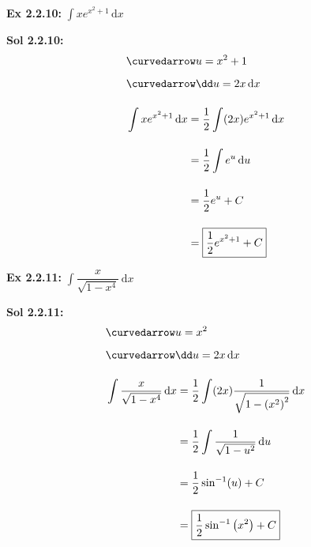\begin{tcolorbox}[example]
    \textbf{Ex 2.2.10: } $\int xe^{x^2 + 1} \,\mathrm{d}x$
\end{tcolorbox}
\begin{tcolorbox}[solution]
    \textbf{Sol 2.2.10: } \begin{align*}
        & \curvedarrow u = x^2 + 1 \\[5.5pt]
        & \curvedarrow \dd u = 2x \,\mathrm{d}x \\[11pt]
        & \int xe^{x^2 + 1} \,\mathrm{d}x \begin{aligned}[t]
            & = \dfrac{1}{2}\int (2x)e^{x^2 + 1} \,\mathrm{d}x \\[11pt]
            & = \dfrac{1}{2}\int e^u \,\mathrm{d}u \\[11pt]
            & = \dfrac{1}{2}e^u + C \\[11pt]
            & = \boxed{\dfrac{1}{2}e^{x^2 + 1} + C}
        \end{aligned}
    \end{align*}
\end{tcolorbox} \vspace{11pt}

\begin{tcolorbox}[example]
    \textbf{Ex 2.2.11: } $\int \dfrac{x}{\sqrt{1 - x^4}} \,\mathrm{d}x$
\end{tcolorbox}
\begin{tcolorbox}[solution]
    \textbf{Sol 2.2.11: } \begin{align*}
        & \curvedarrow u = x^2 \\[5.5pt]
        & \curvedarrow \dd u = 2x \,\mathrm{d}x \\[11pt]
        & \int \dfrac{x}{\sqrt{1 - x^4}} \,\mathrm{d}x \begin{aligned}[t]
            & = \dfrac{1}{2}\int (2x)\dfrac{1}{\sqrt{1 - \left(x^2\right)^2}} \,\mathrm{d}x \\[11pt]
            & = \dfrac{1}{2} \int \dfrac{1}{\sqrt{1 - u^2}} \,\mathrm{d}u \\[11pt]
            & = \dfrac{1}{2}\sin^{-1} (u) + C \\[11pt]
            & = \boxed{\dfrac{1}{2}\sin^{-1} \left(x^2\right) + C} 
        \end{aligned}
    \end{align*}
\end{tcolorbox} \vspace{11pt}

